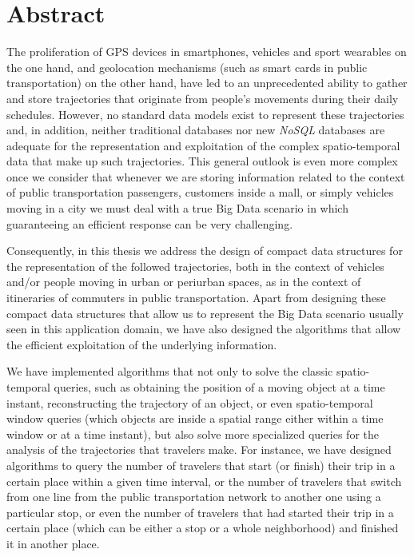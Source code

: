 
\chapter*{Abstract}

The proliferation of GPS devices in smartphones, vehicles and sport wearables on the one hand, and geolocation mechanisms (such as smart cards in public transportation) on the other hand, have led to an unprecedented ability to gather and store trajectories that originate from people's movements during their daily schedules. However, no standard data models exist to represent these trajectories and, in addition, neither traditional databases nor new \textit{NoSQL} databases are adequate for the representation and exploitation of the complex spatio-temporal data that make up such trajectories. This general outlook is even more complex once we consider that whenever we are storing information related to the context of public transportation passengers, customers inside a mall, or simply vehicles moving in a city we must deal with a true Big Data scenario in which guaranteeing an efficient response can be very challenging.

Consequently, in this thesis we address the design of compact data structures for the representation of the followed trajectories, both in the context of vehicles and/or people moving in urban or periurban spaces, as in the context of itineraries of commuters in public transportation. Apart from designing these compact data structures that allow us to represent the Big Data scenario usually seen in this application domain, we have also designed the algorithms that allow the efficient exploitation of the underlying information.

We have implemented algorithms that not only to solve the classic spatio-temporal queries, such as obtaining the position of a moving object at a time instant, reconstructing the trajectory of an object, or even spatio-temporal window queries (which objects are inside a spatial range either within a time window or at a time instant), but also solve more specialized queries for the analysis of the trajectories that travelers make. For instance, we have designed algorithms to query the number of travelers that start (or finish) their trip in a certain place within a given time interval, or the number of travelers that switch from one line from the public transportation network to another one using a particular stop, or even the number of travelers that had started their trip in a certain place (which can be either a stop or a whole neighborhood) and finished it in another place.

